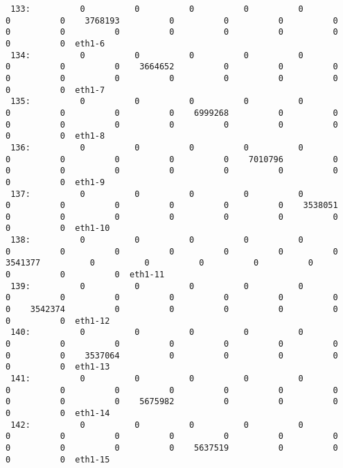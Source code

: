 \begin{lstlisting}
 133:          0          0          0          0          0          0          0    3768193          0          0          0          0          0          0          0          0          0          0          0          0          0  eth1-6
 134:          0          0          0          0          0          0          0          0    3664652          0          0          0          0          0          0          0          0          0          0          0          0  eth1-7
 135:          0          0          0          0          0          0          0          0          0    6999268          0          0          0          0          0          0          0          0          0          0          0  eth1-8
 136:          0          0          0          0          0          0          0          0          0          0    7010796          0          0          0          0          0          0          0          0          0          0  eth1-9
 137:          0          0          0          0          0          0          0          0          0          0          0    3538051          0          0          0          0          0          0          0          0          0  eth1-10
 138:          0          0          0          0          0          0          0          0          0          0          0          0    3541377          0          0          0          0          0          0          0          0  eth1-11
 139:          0          0          0          0          0          0          0          0          0          0          0          0          0    3542374          0          0          0          0          0          0          0  eth1-12
 140:          0          0          0          0          0          0          0          0          0          0          0          0          0          0    3537064          0          0          0          0          0          0  eth1-13
 141:          0          0          0          0          0          0          0          0          0          0          0          0          0          0          0    5675982          0          0          0          0          0  eth1-14
 142:          0          0          0          0          0          0          0          0          0          0          0          0          0          0          0          0    5637519          0          0          0          0  eth1-15
\end{lstlisting}


